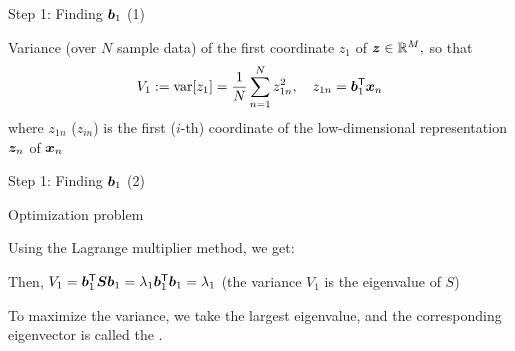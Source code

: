 \documentclass[handout,fleqn,aspectratio=169]{beamer}
\begin{document}
\begin{frame}{Step 1: Finding $\bm{b}_1$ (1)}

\plitemsep 0.1in

\small
\bci 

\item Variance (over $N$ sample data) of the first coordinate $z_1$ of $\bm{z} \in {\mathbb R}^{M},$ so that
$$
V_1 := \text{var}[ z_1 ] = \frac{1}{N} \sum_{n=1}^N z_{1n}^2, \quad z_{1n} = {\bm{b}}^{\mathsf{T}}_1  \bm{x}_n
$$
where $z_{1n}$ ($z_{in}$) is the first ($i$-th) coordinate of the low-dimensional representation $\bm{z}_n$ of $\bm{x}_n$

\item {}

\eci
\end{frame}

\begin{frame}{Step 1: Finding $\bm{b}_1$ (2)}


\plitemsep 0.1in

\small
\bci 

\item Optimization problem

\item Using the Lagrange multiplier method, we get: \hfill {}
\item Then, $V_1 = {\bm{b}}^{\mathsf{T}}_1 \bm{S} \bm{b}_1 = \lambda_1 {\bm{b}}^{\mathsf{T}}_1 \bm{b}_1 = \lambda_1$ (the variance $V_1$ is the eigenvalue of $S$)

\item To maximize the variance, we take the largest eigenvalue, and the corresponding eigenvector is called the .

\eci
\end{frame}
\end{document}
